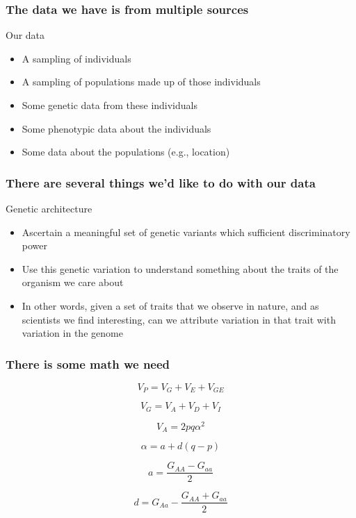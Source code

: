 \begin{frame}
\frametitle{The data we have is from multiple sources}
\begin{block}{Our data}
\begin{itemize}
\item{A sampling of individuals}
\item{A sampling of populations made up of those individuals}
\item{Some genetic data from these individuals}
\item{Some phenotypic data about the individuals}
\item{Some data about the populations (e.g., location)}
\end{itemize}

\end{block}\end{frame}

\begin{frame}
\frametitle{There are several things we'd like to do with our data}

\begin{block}{Genetic architecture}
\begin{itemize}
\item{Ascertain a meaningful set of genetic variants which sufficient
discriminatory power}
\item{Use this genetic variation to understand something about the 
traits of the organism we care about}
\item{In other words, given a set of traits that we observe in nature, and as
scientists we find interesting, can we attribute variation in that trait with
variation in the genome}
\end{itemize}
\end{block}
\end{frame}

\begin{frame}
\frametitle{There is some math we need}
\begin{block}{}
\begin{equation}
\label{eqn:V_P}
V_P = V_G + V_E + V_{GE}
\end{equation}

\begin{equation}
\label{eqn:V_G}
V_G = V_A + V_D + V_I
\end{equation}

\begin{equation}
\label{eqn:V_A}
V_A = 2pq\alpha^2
\end{equation}

\begin{equation}
\label{eqn:alpha}
\alpha = a + d(q-p)
\end{equation}

\begin{equation}
\label{eqn:a}
a = \frac{G_{AA}-G_{aa}}{2}
\end{equation}

\begin{equation}
\label{eqn:d}
d = G_{Aa} - \frac{G_{AA}+G_{aa}}{2}
\end{equation}

\end{block}{}
\end{frame}

